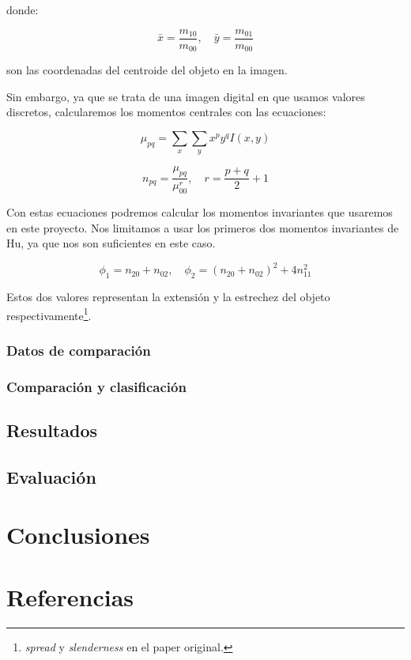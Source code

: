 \documentclass[letter]{article}
\begin{document}
donde:

$$ \bar x = \frac{m_{10}}{m_{00}}, \quad \bar y = \frac{m_{01}}{m_{00}} $$

son las coordenadas del centroide del objeto en la imagen.

Sin embargo, ya que se trata de una imagen digital en que usamos valores
discretos, calcularemos los momentos centrales con las ecuaciones:

$$
\mu_{pq} = \sum_x \sum_y x^p y^q I(x, y)
$$

$$ n_{pq} = \frac{\mu_{pq}}{\mu_{00}^r}, \quad r=\frac{p+q}{2}+1 $$

Con estas ecuaciones podremos calcular los momentos invariantes que usaremos en
este proyecto. Nos limitamos a usar los primeros dos momentos invariantes de Hu,
ya que nos son suficientes en este caso.

$$ \phi_1 = n_{20} + n_{02}, \quad \phi_2 = (n_{20} + n_{02})^2 + 4n_{11}^2 $$

Estos dos valores representan la extensión y la estrechez del objeto
respectivamente\footnote{\emph{spread} y \emph{slenderness} en el paper original.}.

\subsubsection{Datos de comparación}
\label{sec:org2621ee7}

\subsubsection{Comparación y clasificación}
\label{sec:org9ba82ef}

\subsection{Resultados}
\label{sec:org6f37a7a}
\subsection{Evaluación}
\label{sec:orga4e596b}
\section{Conclusiones}
\label{sec:orgd53337c}

\section{Referencias}
\label{sec:orgc63f36b}
\end{document}
